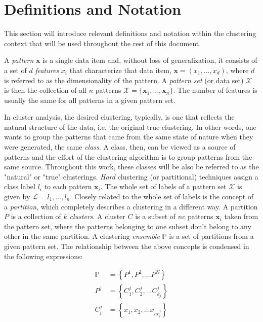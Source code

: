 \section{Definitions and Notation}

This section will introduce relevant definitions and notation within the clustering context that will be used throughout the rest of this document.

A \emph{pattern} $\mathbf{x}$ is a single data item and, without loss of generalization, it consists of a set of $d$ \emph{features} $x_i$ that characterize that data item, $\mathbf{x} = (x_1, \ldots, x_d)$, where $d$ is referred to as the dimensionality of the pattern.
A \emph{pattern set} (or data set) $\mathcal{X}$ is then the collection of all $n$ patterns $\mathcal{X} = \{ \mathbf{x}_1, \ldots, \mathbf{x}_n \}$.
The number of features is usually the same for all patterns in a given pattern set.

In cluster analysis, the desired clustering, typically, is one that reflects the natural structure of the data, i.e. the original true clustering.
In other words, one wants to group the patterns that came from the same state of nature when they were generated, the same \emph{class}.
A class, then, can be viewed as a source of patterns and the effort of the clustering algorithm is to group patterns from the same source.
Throughout this work, these classes will be also be referred to as the "natural" or "true" clusterings.
\emph{Hard} clustering (or partitional) techniques assign a class label $l_i$ to each pattern $\mathbf{x}_i$.
The whole set of labels of a pattern set $\mathcal{X}$ is given by $\mathcal{L} = {l_1, \ldots, l_n}$.
Closely related to the whole set of labels is the concept of a \emph{partition}, which completely describes a clustering in a different way.
A partition $P$ is a collection of $k$ \emph{clusters}.
A cluster $C$ is a subset of $nc$ patterns $\mathbf{x}_i$ taken from the pattern set, where the patterns belonging to one subset don't belong to any other in the same partition.
A clustering \emph{ensemble} $\mathbb{P}$ is a set of partitions from a given pattern set.
The relationship between the above concepts is condensed in the following expressions:

\begin{align}
    \mathbb{P} &= \left \{   P^1, P^2, \ldots P^N   \right \}  \label{eq:ensemble} \\
    P^j &= \left \{   C^j_1, C^j_2, \ldots C^{j}_{k_j}   \right \}  \label{eq:partition} \\
    C^j_i &= \left \{   x_1, x_2, \ldots x_{nc^j_i}   \right \} \label{eq:cluster}
\end{align}


